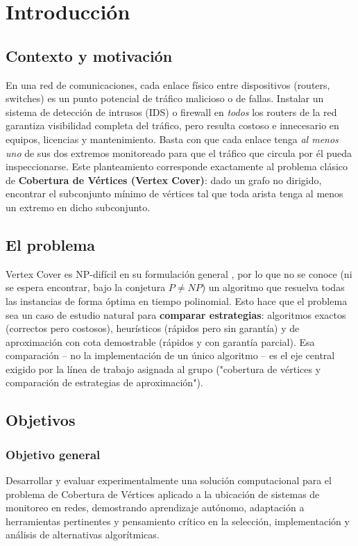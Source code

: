 \documentclass[11pt,a4paper]{article}
\begin{document}
\section{Introducción}

\subsection{Contexto y motivación}
En una red de comunicaciones, cada enlace físico entre dispositivos (routers, switches) es
un punto potencial de tráfico malicioso o de fallas. Instalar un sistema de detección de
intrusos (IDS) o firewall en \emph{todos} los routers de la red garantiza visibilidad
completa del tráfico, pero resulta costoso e innecesario en equipos, licencias y
mantenimiento. Basta con que cada enlace tenga \emph{al menos uno} de sus dos extremos
monitoreado para que el tráfico que circula por él pueda inspeccionarse. Este planteamiento
corresponde exactamente al problema clásico de \textbf{Cobertura de Vértices (Vertex
Cover)}: dado un grafo no dirigido, encontrar el subconjunto mínimo de vértices tal que toda
arista tenga al menos un extremo en dicho subconjunto.

\subsection{El problema}
Vertex Cover es NP-difícil en su formulación general \cite{karp1972}, por lo que no se
conoce (ni se espera encontrar, bajo la conjetura $P \neq NP$) un algoritmo que resuelva
todas las instancias de forma óptima en tiempo polinomial. Esto hace que el problema sea un
caso de estudio natural para \textbf{comparar estrategias}: algoritmos exactos (correctos
pero costosos), heurísticos (rápidos pero sin garantía) y de aproximación con cota
demostrable (rápidos y con garantía parcial). Esa comparación -- no la implementación de un
único algoritmo -- es el eje central exigido por la línea de trabajo asignada al grupo
("cobertura de vértices y comparación de estrategias de aproximación").

\subsection{Objetivos}

\subsubsection*{Objetivo general}
Desarrollar y evaluar experimentalmente una solución computacional para el problema de
Cobertura de Vértices aplicado a la ubicación de sistemas de monitoreo en redes,
demostrando aprendizaje autónomo, adaptación a herramientas pertinentes y pensamiento
crítico en la selección, implementación y análisis de alternativas algorítmicas.
\end{document}
